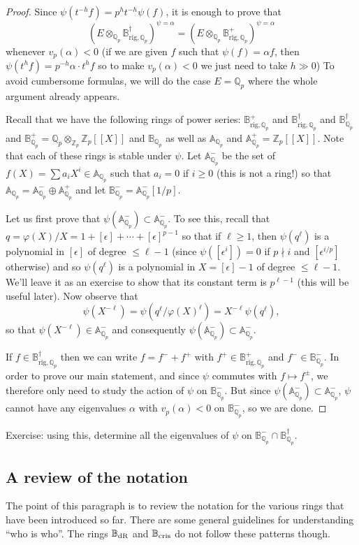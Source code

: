 \documentclass[11pt]{amsart}
\def\Z{{\mathbb Z}_p}
\def\Q{{\mathbb Q}_p}
\def\aa{\mathbb{A}}
\def\bb{\mathbb{B}}
\def\aplus{\mathbb{A}^+}
\def\bplus{\mathbb{B}^+}
\def\aminus{\mathbb{A}^-}
\def\bminus{\mathbb{B}^-}
\newcommand{\bdag}[1]{\mathbb{B}^{\dagger #1}}
\newcommand{\bhol}[1]{\mathbb{B}^+_{\mathrm{rig} #1}}
\newcommand{\bnrig}[2]{\mathbb{B}^{\dagger #1}_{\mathrm{rig} #2}}
\def\bcris{\mathbb{B}_{\rm cris}}
\def\bdR{\mathbb{B}_{\rm dR}}
\begin{document}
\begin{proof} 
Since $\psi(t^{-h}f) = p^h t^{-h} \psi(f)$, 
it is enough to prove that \[ (E \otimes_{\Q}  
\bnrig{}{,\Q})^{\psi=\alpha} =  
(E \otimes_{\Q} \bhol{,\Q})^{\psi=\alpha} \] 
whenever $v_p(\alpha)<0$ (if we are given $f$ such that 
$\psi(f)=\alpha f$, then $\psi(t^h f) = p^{-h} \alpha \cdot t^h f$ so to 
make $v_p(\alpha)<0$ we just need to take $h \gg 0$) 
To avoid cumbersome formulas, we will do the case $E=\Q$ where the 
whole argument already appears. 
 
Recall that we have the following  
rings of power series: $\bhol{,\Q}$ and 
$\bnrig{}{,\Q}$ and $\bdag{}_{\Q}$ and $\bplus_{\Q} = \Q \otimes_{\Z} 
\Z[[X]]$ and $\bb_{\Q}$ as well as $\aa_{\Q}$ and $\aplus_{\Q} = 
\Z[[X]]$. Note that each of these rings is stable under $\psi$.  
Let $\aminus_{\Q}$ be the set of $f(X)=\sum a_i X^i \in \aa_{\Q}$ such 
that $a_i = 0$ if $i \geq 0$ (this is not a ring!) so that $\aa_{\Q} = 
\aminus_{\Q} \oplus \aplus_{\Q}$ and let 
$\bminus_{\Q}=\aminus_{\Q}[1/p]$.  
 
Let us first prove that $\psi(\aminus_{\Q}) \subset \aminus_{\Q}$.  
To see this, recall that $q=\varphi(X)/X=1+[\epsilon]+\cdots+[\epsilon]^{p-1}$ so 
that if $\ell \geq 1$, then
$\psi(q^\ell)$ is a polynomial in $[\epsilon]$ of degree $\leq 
\ell-1$ (since $\psi([\epsilon^i])=0$ if $p \nmid i$ and $[\epsilon^{i/p}]$ 
otherwise) and so $\psi(q^\ell)$ is a polynomial in  
$X=[\epsilon]-1$ of degree $\leq \ell-1$. We'll leave it as an exercise to 
show that its constant term is $p^{\ell-1}$ (this will be useful 
later).  
Now observe that 
\[ \psi(X^{-\ell})=\psi(q^\ell / \varphi(X)^\ell) = X^{-\ell} 
\psi(q^\ell), \] 
so that $\psi(X^{-\ell}) \in \aminus_{\Q}$ and consequently 
$\psi(\aminus_{\Q}) \subset \aminus_{\Q}$.  
 
If $f \in \bnrig{}{,\Q}$ then we can write $f=f^-+f^+$ with $f^+ \in 
\bhol{,\Q}$ and $f^- \in \bminus_{\Q}$. In order to prove our main 
statement, and since $\psi$ commutes with $f \mapsto f^\pm$, we 
therefore only need to study the action of $\psi$ on $\bminus_{\Q}$.  
But since $\psi(\aminus_{\Q}) \subset \aminus_{\Q}$, $\psi$ cannot 
have any eigenvalues $\alpha$ with $v_p(\alpha)<0$  
on $\bminus_{\Q}$, so we are done.  
\end{proof} 
 
Exercise: using this, determine all the eigenvalues of $\psi$ on 
$\bminus_{\Q} \cap \bdag{}_{\Q}$.  
 
\subsection{A review of the notation} 
The point of this paragraph is to review the notation for the various 
rings that have been introduced so far. There are some general 
guidelines for understanding ``who is who''. The rings $\bdR$ and 
$\bcris$ do not follow these patterns though. 
 
\end{document}
